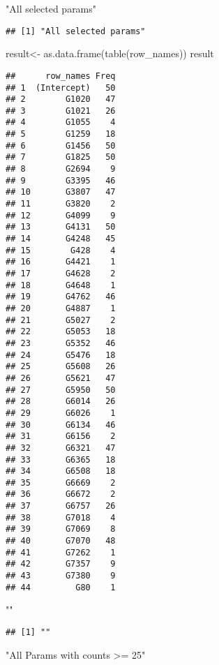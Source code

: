 \documentclass[
]{article}
\newenvironment{Shaded}{\begin{snugshade}}{\end{snugshade}}
\newcommand{\FunctionTok}[1]{\textcolor[rgb]{0.00,0.00,0.00}{#1}}
\newcommand{\NormalTok}[1]{#1}
\newcommand{\OtherTok}[1]{\textcolor[rgb]{0.56,0.35,0.01}{#1}}
\newcommand{\StringTok}[1]{\textcolor[rgb]{0.31,0.60,0.02}{#1}}
\begin{document}
\begin{Shaded}
\begin{Highlighting}[]
\StringTok{"All selected params"}
\end{Highlighting}
\end{Shaded}

\begin{verbatim}
## [1] "All selected params"
\end{verbatim}

\begin{Shaded}
\begin{Highlighting}[]
\NormalTok{result}\OtherTok{\textless{}{-}} \FunctionTok{as.data.frame}\NormalTok{(}\FunctionTok{table}\NormalTok{(row\_names))}
\NormalTok{result}
\end{Highlighting}
\end{Shaded}

\begin{verbatim}
##      row_names Freq
## 1  (Intercept)   50
## 2        G1020   47
## 3        G1021   26
## 4        G1055    4
## 5        G1259   18
## 6        G1456   50
## 7        G1825   50
## 8        G2694    9
## 9        G3395   46
## 10       G3807   47
## 11       G3820    2
## 12       G4099    9
## 13       G4131   50
## 14       G4248   45
## 15        G428    4
## 16       G4421    1
## 17       G4628    2
## 18       G4648    1
## 19       G4762   46
## 20       G4887    1
## 21       G5027    2
## 22       G5053   18
## 23       G5352   46
## 24       G5476   18
## 25       G5608   26
## 26       G5621   47
## 27       G5950   50
## 28       G6014   26
## 29       G6026    1
## 30       G6134   46
## 31       G6156    2
## 32       G6321   47
## 33       G6365   18
## 34       G6508   18
## 35       G6669    2
## 36       G6672    2
## 37       G6757   26
## 38       G7018    4
## 39       G7069    8
## 40       G7070   48
## 41       G7262    1
## 42       G7357    9
## 43       G7380    9
## 44         G80    1
\end{verbatim}

\begin{Shaded}
\begin{Highlighting}[]
\StringTok{""}
\end{Highlighting}
\end{Shaded}

\begin{verbatim}
## [1] ""
\end{verbatim}

\begin{Shaded}
\begin{Highlighting}[]
\StringTok{"All Params with counts \textgreater{}= 25"}
\end{Highlighting}
\end{Shaded}
\end{document}
